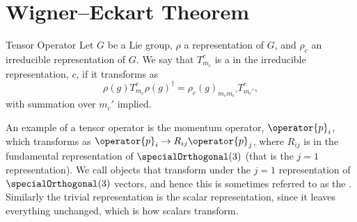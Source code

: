 \documentclass[fleqn]{NotesClass}
\newcommand*{\hermit}{\dagger}
\begin{document}
    \section{Wigner--Eckart Theorem}
    \begin{dfn}{Tensor Operator}{}
        Let \(G\) be a Lie group, \(\rho\) a representation of \(G\), and \(\rho_c\) an irreducible representation of \(G\).
        We say that \(T_{m_c}^c\) is a  in the irreducible representation, \(c\), if it transforms as
        \begin{equation}
            \rho(g)T_{m_c}^{c}\rho(g)^\hermit = \rho_c(g)_{m_cm_c'}T_{m_c'}^{c},
        \end{equation}
        with summation over \(m_c'\) implied.
    \end{dfn}
    
    An example of a tensor operator is the momentum operator, \(\operator{p}_i\), which transforms as \(\operator{p}_i \to R_{ij}\operator{p}_j\), where \(R_{ij}\) is in the fundamental representation of \(\specialOrthogonal(3)\) (that is the \(j = 1\) representation).
    We call objects that transform under the \(j = 1\) representation of \(\specialOrthogonal(3)\) vectors, and hence this is sometimes referred to as the .
    Similarly the trivial representation is the scalar representation, since it leaves everything unchanged, which is how scalars transform.
    
\end{document}
